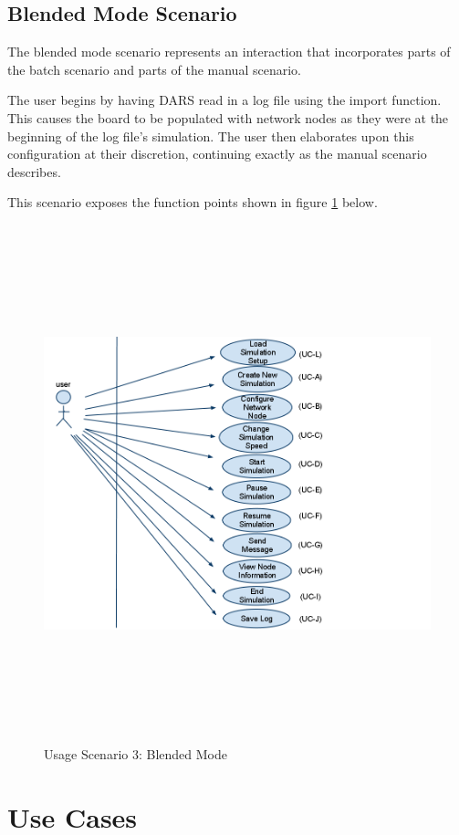 \documentclass[a4paper,11pt,titlepage]{article}
\begin{document}
\subsection{Blended Mode Scenario}
The blended mode scenario represents an interaction that incorporates parts of the batch scenario and parts of the manual scenario.
 
The user begins by having DARS read in a log file using the import function. This causes the board to be populated with network nodes as they were at the beginning of the log file’s simulation. The user then elaborates upon this configuration at their discretion, continuing exactly as the manual scenario describes.

This scenario exposes the function points shown in figure \ref{fig:scen3} below.
\begin{figure}[H]
        \centering
	\includegraphics[height=150mm]{img/scenario3.png}
        \caption{Usage Scenario 3: Blended Mode}
        \label{fig:scen3}
\end{figure}

\section{Use Cases}
\end{document}

